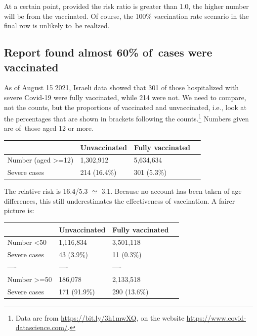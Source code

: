 \documentclass[
  10pt,
  b5paper]{book}
\begin{document}
At a certain point, provided the risk ratio is greater than 1.0, the higher number will be from the vaccinated. Of course, the 100\% vaccination rate scenario in the final row is unlikely to~be realized.

\hypertarget{report-found-almost-60-of-cases-were-vaccinated}{%
\subsection*{Report found almost 60\% of~cases were vaccinated}\label{report-found-almost-60-of-cases-were-vaccinated}}

As of August 15 2021, Israeli data showed that 301 of those hospitalized with severe Covid-19 were fully vaccinated, while 214 were not. We need to compare, not the counts, but the proportions of vaccinated and unvaccinated, i.e., look at the percentages that are shown in brackets following the counts.\footnote{Data are from \url{https://bit.ly/3h1mwXQ}, on the website \url{https://www.covid-datascience.com/}.} Numbers given are of~those aged 12 or more.

\begin{longtable}[]{@{}llll@{}}
\toprule\noalign{}
& Unvaccinated & Fully vaccinated & \\
\midrule\noalign{}
\endhead
\bottomrule\noalign{}
\endlastfoot
Number (aged \textgreater=12) & 1,302,912 & 5,634,634 & \\
Severe cases & 214 (16.4\%) & 301 (5.3\%) & \\
\end{longtable}

The relative risk is 16.4/5.3 \(\simeq\) 3.1. Because no account has been taken of age differences, this still underestimates the effectiveness of vaccination. A fairer picture is:

\begin{longtable}[]{@{}llll@{}}
\toprule\noalign{}
& Unvaccinated & Fully vaccinated & \\
\midrule\noalign{}
\endhead
\bottomrule\noalign{}
\endlastfoot
Number \textless50 & 1,116,834 & 3,501,118 & \\
Severe cases & 43 (3.9\%) & 11 (0.3\%) & \\
---- & ---- & ---- & \\
Number \textgreater=50 & 186,078 & 2,133,518 & \\
Severe cases & 171 (91.9\%) & 290 (13.6\%) & \\
\end{longtable}
\end{document}
